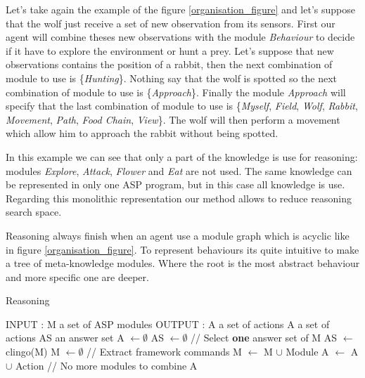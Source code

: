 \documentclass{aamas2012}
\begin{document}
	Let's take again the example of the figure \ref{organisation_figure} and let's suppose that the wolf just receive a set of new observation from its sensors.
	First our agent will combine theses new observations with the module \emph{Behaviour} to decide if it have to explore the environment or hunt a prey.
	Let's suppose that new observations contains the position of a rabbit, then the next combination of module to use is \{\emph{Hunting}\}.
	Nothing say that the wolf is spotted so the next combination of module to use is \{\emph{Approach}\}.
	Finally the module \emph{Approach} will specify that the last combination of module to use is 
	\{\emph{Myself}, \emph{Field}, \emph{Wolf}, \emph{Rabbit}, \emph{Movement}, \emph{Path}, \emph{Food Chain}, \emph{View}\}.
	The wolf will then perform a movement which allow him to approach the rabbit without being spotted.
	
	In this example we can see that only a part of the knowledge is use for reasoning: 
	modules \emph{Explore}, \emph{Attack}, \emph{Flower} and \emph{Eat} are not used.
	The same knowledge can be represented in only one ASP program, but in this case all knowledge is use.
	Regarding this monolithic representation our method allows to reduce reasoning search space.
	
	Reasoning always finish when an agent use a module graph which is acyclic like in figure \ref{organisation_figure}.
	To represent behaviours its quite intuitive to make a tree of meta-knowledge modules.
	Where the root is the most abstract behaviour and more specific one are deeper.

	\begin{algorithm}
	\caption{Reasoning}
	\label{framework_algorithm}
	\begin{algorithmic}[1]
	\STATE INPUT : M a set of ASP modules
	\STATE OUTPUT : A a set of actions
	\newline
	\STATE A a set of actions
	\STATE AS an answer set
	\newline
	\STATE A $\leftarrow \emptyset$
	\STATE AS $\leftarrow \emptyset$
	\newline
	\REPEAT
		\STATE // Select \textbf{one} answer set of M
		\STATE AS $\leftarrow$ clingo(M)
		\STATE M $\leftarrow \emptyset$ 
		\newline
		\STATE // Extract framework commands
				\STATE M $\leftarrow$ M $\cup$ Module
			\ENDIF
				\STATE A $\leftarrow$ A $\cup$ Action
			\ENDIF
		\ENDFOR
	 // No more modules to combine
	\newline
	\RETURN A
	\end{algorithmic}
	\end{algorithm}
\end{document}
